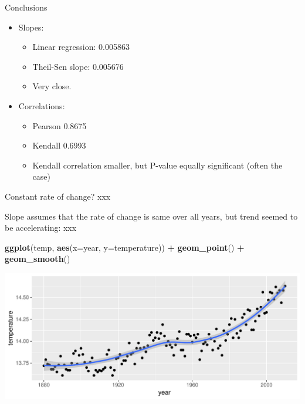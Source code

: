 \documentclass[ignorenonframetext,]{beamer}
\newenvironment{Shaded}{\begin{snugshade}}{\end{snugshade}}
\newcommand{\DataTypeTok}[1]{\textcolor[rgb]{0.13,0.29,0.53}{#1}}
\newcommand{\KeywordTok}[1]{\textcolor[rgb]{0.13,0.29,0.53}{\textbf{#1}}}
\newcommand{\NormalTok}[1]{#1}
\newcommand{\OperatorTok}[1]{\textcolor[rgb]{0.81,0.36,0.00}{\textbf{#1}}}
\newcommand{\StringTok}[1]{\textcolor[rgb]{0.31,0.60,0.02}{#1}}
\providecommand{\tightlist}{%
  \setlength{\itemsep}{0pt}\setlength{\parskip}{0pt}}
\begin{document}
\begin{frame}{Conclusions}
\protect\hypertarget{conclusions}{}

\begin{itemize}
\tightlist
\item
  Slopes:

  \begin{itemize}
  \tightlist
  \item
    Linear regression: 0.005863
  \item
    Theil-Sen slope: 0.005676
  \item
    Very close.
  \end{itemize}
\item
  Correlations:

  \begin{itemize}
  \tightlist
  \item
    Pearson 0.8675
  \item
    Kendall 0.6993
  \item
    Kendall correlation smaller, but P-value equally significant (often
    the case)
  \end{itemize}
\end{itemize}

\end{frame}

\begin{frame}[fragile]{Constant rate of change? xxx}
\protect\hypertarget{constant-rate-of-change-xxx}{}

Slope assumes that the rate of change is same over all years, but trend
seemed to be accelerating: xxx

\begin{Shaded}
\begin{Highlighting}[]
\KeywordTok{ggplot}\NormalTok{(temp, }\KeywordTok{aes}\NormalTok{(}\DataTypeTok{x=}\NormalTok{year, }\DataTypeTok{y=}\NormalTok{temperature)) }\OperatorTok{+}\StringTok{ }
\StringTok{  }\KeywordTok{geom_point}\NormalTok{() }\OperatorTok{+}\StringTok{ }\KeywordTok{geom_smooth}\NormalTok{()}
\end{Highlighting}
\end{Shaded}

\includegraphics{figure/unnamed-chunk-13-1.pdf}

\end{frame}
\end{document}
